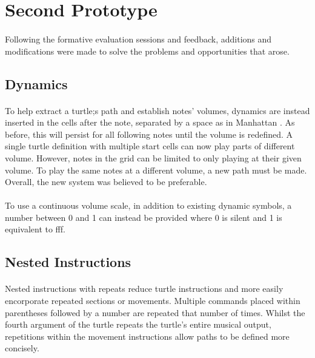 \section{Second Prototype}

\paragraph{} Following the formative evaluation sessions and feedback, additions and modifications were made to solve the problems and opportunities that arose.

\subsection{Dynamics}

\paragraph{} To help extract a turtle;s path and establish notes' volumes, dynamics are instead inserted in the cells after the note, separated by a space as in Manhattan \cite{nash:manhattan}. As before, this will persist for all following notes until the volume is redefined. A single turtle definition with multiple start cells can now play parts of different volume. However, notes in the grid can be limited to only playing at their given volume. To play the same notes at a different volume, a new path must be made. Overall, the new system was believed to be preferable.

\paragraph{} To use a continuous volume scale, in addition to existing dynamic symbols, a number between 0 and 1 can instead be provided where 0 is silent and 1 is equivalent to fff.

\subsection{Nested Instructions}

\paragraph{} Nested instructions with repeats reduce turtle instructions and more easily encorporate repeated sections or movements. Multiple commands placed within parentheses followed by a number are repeated that number of times. Whilst the fourth argument of the turtle repeats the turtle's entire musical output, repetitions within the movement instructions allow paths to be defined more concisely.

